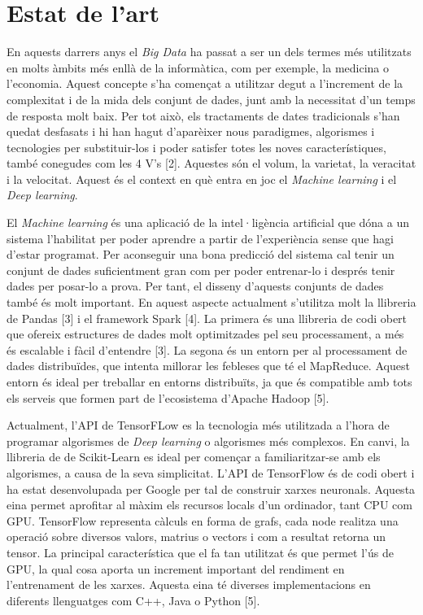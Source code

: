 \documentclass[10pt,a4paper,twocolumn,twoside]{article}
\begin{document}
\section {Estat de l'art}
En aquests darrers anys el \textit{Big Data} ha passat a ser un dels termes més utilitzats en molts àmbits més enllà de la informàtica, com per exemple, la medicina o l'economia. Aquest concepte s'ha començat a utilitzar degut a l'increment de la complexitat i de la mida dels conjunt de dades, junt amb la necessitat d'un temps de resposta molt baix. Per tot això, els tractaments de dates tradicionals s'han quedat desfasats i hi han hagut d'aparèixer nous paradigmes, algorismes i tecnologies per substituir-los i poder satisfer totes les noves característiques, també conegudes com les 4 V's [2]. Aquestes són el volum, la varietat, la veracitat i la velocitat. Aquest és el context en què entra en joc el \textit{Machine learning} i el \textit{Deep learning}.

El \textit{Machine learning} és una aplicació de la intel·ligència artificial que dóna a un sistema l'habilitat per poder aprendre a partir de l'experiència sense que hagi d'estar programat. Per aconseguir una bona predicció del sistema cal tenir un conjunt de dades suficientment gran com per poder entrenar-lo i després tenir dades per posar-lo a prova. Per tant, el disseny d'aquests conjunts de dades també és molt important. En aquest aspecte actualment s'utilitza molt la llibreria de Pandas [3] i el framework Spark [4]. La primera és una llibreria de codi obert que ofereix estructures de dades molt optimitzades pel seu processament, a més és escalable i fàcil d'entendre [3]. La segona és un entorn per al processament de dades distribuïdes, que intenta millorar les febleses que té el MapReduce. Aquest entorn és ideal per treballar en entorns distribuïts, ja que és compatible amb tots els serveis que formen part de l'ecosistema d'Apache Hadoop [5].

Actualment, l'API de TensorFLow es la tecnologia més utilitzada a l'hora de programar algorismes de \textit{Deep learning} o algorismes més complexos. En canvi, la llibreria de de Scikit-Learn es ideal per començar a familiaritzar-se amb els algorismes, a causa de la seva simplicitat. L'API de TensorFlow és de codi obert i ha estat desenvolupada per Google per tal de construir xarxes neuronals. Aquesta eina permet aprofitar al màxim els recursos locals d'un ordinador, tant CPU com GPU. TensorFlow representa càlculs en forma de grafs, cada node realitza una operació sobre diversos valors, matrius o vectors i com a resultat retorna un tensor. La principal característica que el fa tan utilitzat és que permet l'ús de GPU, la qual cosa aporta un increment important del rendiment en l'entrenament de les xarxes. Aquesta eina té diverses implementacions en diferents llenguatges com C++, Java o Python [5].
\end{document}
